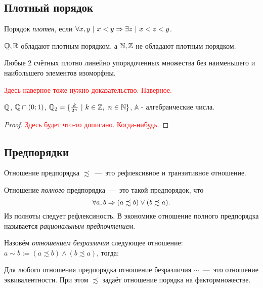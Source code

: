 \subsection{Плотный порядок}

\begin{definition}
	Порядок \textit{плотен}, если $\forall x, y\ |\ x < y \Rightarrow \exists z\ |\ x < z < y$.
\end{definition}

\begin{example}
	$\mathbb{Q}, \mathbb{R}$ обладают плотным порядком, а $\mathbb{N}, \mathbb{Z}$ не обладают плотным порядком.
\end{example}

\begin{theorem}
	Любые 2 счётных плотно линейно упорядоченных множества без наименьшего и наибольшего элементов изоморфны.
\end{theorem}

\textcolor{red}{Здесь наверное тоже нужно доказательство. Наверное.}

\begin{example}
	$\mathbb{Q}$, $\mathbb{Q} \cap (0;1)$, $\Q_2 = \{\frac{k}{2^n}\ |\ k \in \Z,\ n \in \N\}$, $\mathbb{A}$ - алгебраические числа.
\end{example}

\begin{proof}
\textcolor{red}{Здесь будет что-то дописано. Когда-нибудь.}
\end{proof}

\subsection{Предпорядки}

\begin{definition}
	Отношение предпорядка $\precsim$~---~это рефлексивное и транзитивное отношение.
\end{definition}

\begin{definition}
	Отношение \textit{полного} предпорядка~---~это такой предпорядок, что
	$$
		\forall a, b \Rightarrow (a \precsim b) \vee (b \precsim a).
	$$
	Из полноты следует рефлексиность. В экономике отношение полного предпорядка называется \textit{рациональным предпочтением}.
\end{definition}

\begin{theorem}
	Назовём \textit{отношением безразличия} следующее отношение: 
	$a \sim b := (a \precsim b) \wedge (b \precsim a)$, тогда:
	
	Для любого отношения предпорядка отношение безразличия $\sim$~---~это отношение эквивалентности. При этом $\precsim$ задаёт отношение порядка на фактормножестве.
\end{theorem}

